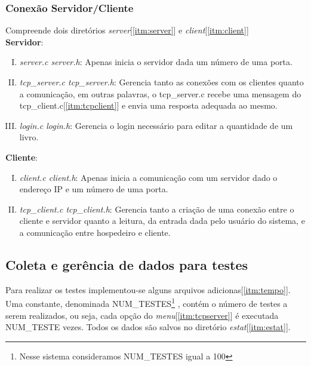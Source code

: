 \documentclass[a4paper,10pt]{article}
\begin{document}
\subsubsection{Conexão Servidor/Cliente}
Compreende dois diretórios \emph{server}[\ref{itm:server}] e \emph{client}[\ref{itm:client}]
\\\textbf{Servidor}:
\begin{enumerate}[I.]
\item \emph{server.c server.h}: Apenas inicia o servidor dada um número de uma porta.
\item \label{itm:tcpserver} \emph{tcp\_server.c tcp\_server.h}: Gerencia tanto as conexões com os clientes quanto a comunicação, em outras palavras, o tcp\_server.c recebe uma mensagem do tcp\_client.c[\ref{itm:tcpclient}] e envia uma resposta adequada ao mesmo.
\item \emph{login.c login.h}: Gerencia o login necessário para editar a quantidade de um livro.
\end{enumerate}
\textbf{Cliente}:
\begin{enumerate}[I.]
\item \emph{client.c client.h}: Apenas inicia a comunicação com um servidor dado o endereço IP e um número de uma porta.
\item \label{itm:tcpclient} \emph{tcp\_client.c tcp\_client.h}: Gerencia tanto 
a criação de uma conexão entre o cliente e servidor quanto a leitura, da entrada dada pelo usuário do sistema, e a comunicação entre hospedeiro e cliente.
\end{enumerate}
\subsection{Coleta e gerência de dados para testes}
Para realizar os testes implementou-se alguns arquivos adicionas[\ref{itm:tempo}]. Uma constante, denominada NUM\_TESTES\footnote{Nesse sistema consideramos NUM\_TESTES igual a 100} , contém o número de testes a serem realizados, ou seja, cada opção do \emph{menu}[\ref{itm:tcpserver}] é executada NUM\_TESTE vezes. Todos os dados são 
salvos no diretório \emph{estat}[\ref{itm:estat}].
\end{document}
